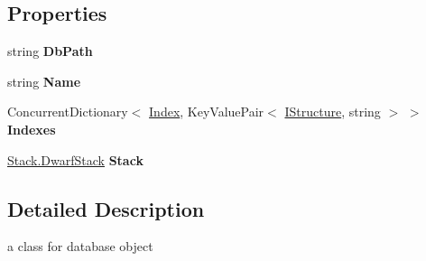 \subsection*{Properties}
\begin{DoxyCompactItemize}
\item 
\hypertarget{class_dwarf_d_b_1_1_data_structures_1_1_data_base_a6d2cec1036e84cf7bd32e14cb57fb2c9}{
string {\bfseries DbPath}}
\label{class_dwarf_d_b_1_1_data_structures_1_1_data_base_a6d2cec1036e84cf7bd32e14cb57fb2c9}

\item 
\hypertarget{class_dwarf_d_b_1_1_data_structures_1_1_data_base_ab8b85389f822faa790eaf18a7fe35cce}{
string {\bfseries Name}}
\label{class_dwarf_d_b_1_1_data_structures_1_1_data_base_ab8b85389f822faa790eaf18a7fe35cce}

\item 
\hypertarget{class_dwarf_d_b_1_1_data_structures_1_1_data_base_ae5d3a3199e83d89ec2915a788721f96c}{
ConcurrentDictionary$<$ \hyperlink{class_dwarf_d_b_1_1_data_structures_1_1_index}{Index}, KeyValuePair$<$ \hyperlink{interface_dwarf_d_b_1_1_data_structures_1_1_i_structure}{IStructure}, string $>$ $>$ {\bfseries Indexes}}
\label{class_dwarf_d_b_1_1_data_structures_1_1_data_base_ae5d3a3199e83d89ec2915a788721f96c}

\item 
\hypertarget{class_dwarf_d_b_1_1_data_structures_1_1_data_base_a2ca4a32633cc1324190d6f37da17cc8b}{
\hyperlink{class_dwarf_d_b_1_1_stack_1_1_dwarf_stack}{Stack.DwarfStack} {\bfseries Stack}}
\label{class_dwarf_d_b_1_1_data_structures_1_1_data_base_a2ca4a32633cc1324190d6f37da17cc8b}

\end{DoxyCompactItemize}


\subsection{Detailed Description}
a class for database object 

